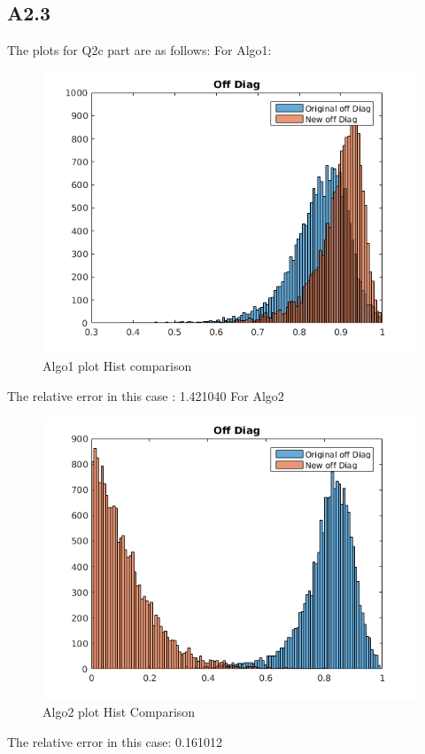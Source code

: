 \documentclass{article}
\begin{document}
\subsection*{A2.3}
The plots for Q2c part are as follows:
For Algo1:
\begin{figure}[H]
  \centering
  \includegraphics[scale=0.5]{images/q2c_actual_algo}
  \caption{Algo1 plot Hist comparison}
  \label{fig:4}
\end{figure}
The relative error in this case : 1.421040
For Algo2
\begin{figure}[H]
  \centering
  \includegraphics[scale=0.5]{images/q2c_lam_inv}
  \caption{Algo2 plot Hist Comparison}
  \label{fig:5}
\end{figure}
The relative error in this case: 0.161012
\end{document}

